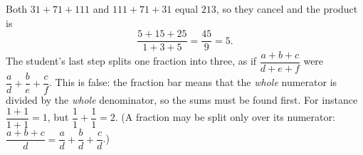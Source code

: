 Both $31+71+111$ and $111+71+31$ equal $213$, so they cancel and the product is
\[\dfrac{5+15+25}{1+3+5}=\dfrac{45}{9}=\boxed{5}.\]
The student's last step splits one fraction into three, as if $\dfrac{a+b+c}{d+e+f}$ were $\dfrac {a}{d}+\dfrac {b}{e}+\dfrac {c}{f}$. This is false: the fraction bar means that the \emph{whole} numerator is divided by the \emph{whole} denominator, so the sums must be found first. For instance $\dfrac{1+1}{1+1}=1$, but $\dfrac{1}{1}+\dfrac{1}{1}=2$. (A fraction may be split only over its numerator: $\dfrac{a+b+c}{d}=\dfrac {a}{d}+\dfrac {b}{d}+\dfrac {c}{d}$.)
